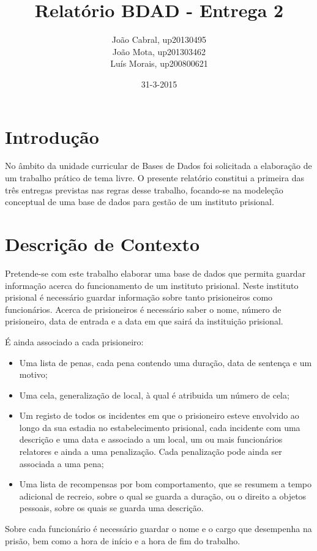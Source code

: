 \documentclass{article}
\title{Relatório BDAD - Entrega 2}
\date{31-3-2015}
\author{João Cabral, up20130495\\
	   João Mota, up201303462\\
	   Luís Morais, up200800621\\}
\begin{document}
\maketitle
{}
\newpage
{}
\renewcommand*\contentsname{Sumário}
\tableofcontents
\newpage
\section{Introdução}
No âmbito da unidade curricular de Bases de Dados foi solicitada a elaboração de um
trabalho prático de tema livre. O presente relatório constitui a primeira das três entregas
previstas nas regras desse trabalho, focando-se na modeleção conceptual de uma base de
dados para gestão de um instituto prisional.


\section{Descrição de Contexto}
Pretende-se com este trabalho elaborar uma base de dados que permita guardar
informação acerca do funcionamento de um instituto prisional. Neste instituto prisional é
necessário guardar informação sobre tanto prisioneiros como funcionários.
Acerca de prisioneiros é necessário saber o nome, número de prisioneiro, data de entrada
e a data em que sairá da instituição prisional.

É ainda associado a cada prisioneiro:
\begin{itemize}
\item Uma lista de penas, cada pena contendo uma duração, data de sentença e um motivo;
\item Uma cela, generalização de local, à qual é atribuida um número de cela;
\item Um registo de todos os incidentes em que o prisioneiro esteve envolvido ao longo da sua estadia no estabelecimento prisional, cada incidente com uma descrição e uma data e associado a um local, um ou mais funcionários relatores e ainda a uma penalização. Cada penalização pode ainda ser associada a uma pena;
\item Uma lista de recompensas por bom comportamento, que se resumem a tempo adicional de recreio, sobre o qual se guarda a duração, ou o direito a objetos pessoais, sobre os quais se guarda uma descrição.
\end{itemize}
Sobre cada funcionário é necessário guardar o nome e o cargo que desempenha na prisão, bem como a hora de início e a hora de fim do trabalho.
\newpage
\end{document}

